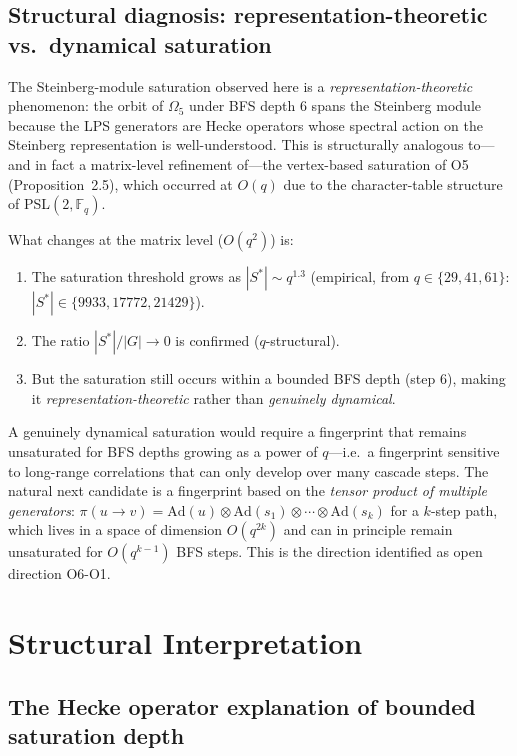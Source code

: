 \documentclass[11pt]{article}
\theoremstyle{definition}
\theoremstyle{remark}
\newcommand{\F}{\mathbb{F}}
\begin{document}
  \subsection{Structural diagnosis: representation-theoretic vs.\ dynamical saturation}
    \label{ssec:stability}

    The Steinberg-module saturation observed here is a \emph{representation-theoretic}
    phenomenon: the orbit of $\Omega_5$ under BFS depth 6 spans the Steinberg module
    because the LPS generators are Hecke operators whose spectral action on the
    Steinberg representation is well-understood.
    This is structurally analogous to---and in fact a matrix-level refinement of---the
    vertex-based saturation of O5 (Proposition~2.5), which occurred at $O(q)$ due to
    the character-table structure of PSL$(2,\F_q)$.

    What changes at the matrix level ($O(q^2)$) is:
    \begin{enumerate}[label=(\arabic*)]
\item The saturation threshold grows as $|S^*| \sim q^{1.3}$ (empirical, from
$q \in \{29,41,61\}$: $|S^*| \in \{9933, 17772, 21429\}$).
\item The ratio $|S^*|/|G| \to 0$ is confirmed ($q$-structural).
\item But the saturation still occurs within a bounded BFS depth (step 6),
making it \emph{representation-theoretic} rather than \emph{genuinely dynamical}.
    \end{enumerate}

    A genuinely dynamical saturation would require a fingerprint that remains unsaturated
    for BFS depths growing as a power of $q$---i.e.\ a fingerprint sensitive to
    long-range correlations that can only develop over many cascade steps.
    The natural next candidate is a fingerprint based on the \emph{tensor product of
  multiple generators}: $\pi(u \to v) = \mathrm{Ad}(u) \otimes \mathrm{Ad}(s_1) \otimes
  \cdots \otimes \mathrm{Ad}(s_k)$ for a $k$-step path, which lives in a space of
    dimension $O(q^{2k})$ and can in principle remain unsaturated for $O(q^{k-1})$
    BFS steps.
    This is the direction identified as open direction O6-O1.

  \section{Structural Interpretation}
  \label{sec:interpretation}

  \subsection{The Hecke operator explanation of bounded saturation depth}
    \label{ssec:unavoidable}
\end{document}
